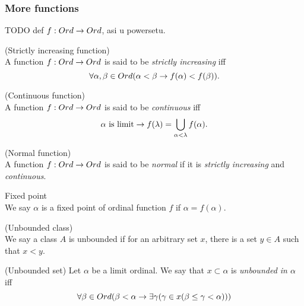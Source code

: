 \subsubsection{More functions}



TODO def $f: Ord \rightarrow Ord$, asi u powersetu.

\begin{definition}{(Strictly increasing function)}\label{def:increasing_function}\\
A function $f: Ord \rightarrow Ord$ is said to be \emph{strictly increasing} iff
\begin{equation}
\forall \alpha, \beta \in Ord (\alpha < \beta \rightarrow f(\alpha) < f(\beta)).
\end{equation}
\end{definition}

\begin{definition}{(Continuous function)}\label{def:continuous_function}\\
A function $f: Ord \rightarrow Ord$ is said to be \emph{continuous} iff
\begin{equation}
\alpha\mbox{ is limit} \rightarrow f(\lambda) = \bigcup_{\alpha < \lambda} f(\alpha).
\end{equation}
\end{definition}

\begin{definition}{(Normal function)}\label{def:normal_function}\\
A function $f: Ord \rightarrow Ord$ is said to be \emph{normal} if it is \emph{strictly increasing} and \emph{continuous}.
\end{definition}

\begin{definition}{Fixed point}\\
We say $\alpha$ is a fixed point of ordinal function $f$ if $\alpha=f(\alpha)$.
\end{definition}

\begin{definition}{(Unbounded class)}\\
We say a class $A$ is unbounded if for an arbitrary set $x$, there is a set $y \in A$ such that $x < y$.
\end{definition}

\begin{definition}{(Unbounded set)}
Let $\alpha$ be a limit ordinal. We say that $x \subset \alpha$ is \emph{unbounded in $\alpha$} iff
\begin{equation}
\forall \beta \in Ord (\beta < \alpha \rightarrow \exists \gamma (\gamma \in x (\beta \leq \gamma < \alpha)))
\end{equation} %
\end{definition}

